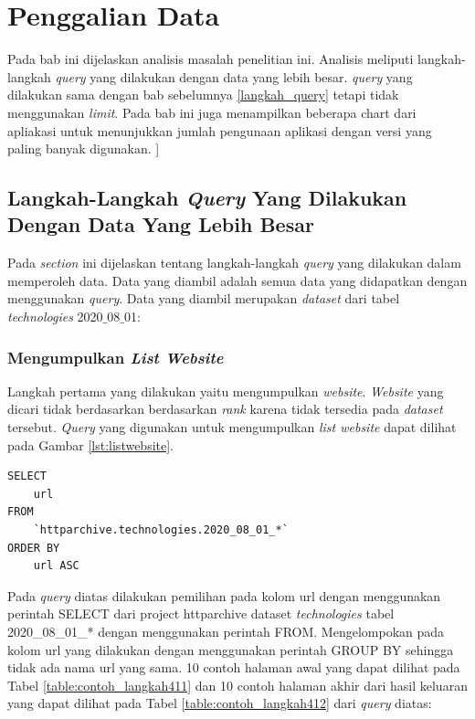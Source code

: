 \chapter{Penggalian Data}
\label{chap:penggalian data}
Pada bab ini dijelaskan analisis masalah penelitian ini. Analisis meliputi langkah-langkah \textit{query} yang dilakukan dengan data yang lebih besar. \textit{query} yang dilakukan sama dengan bab sebelumnya \ref{langkah_query} tetapi tidak menggunakan \textit{limit}. Pada bab ini juga menampilkan beberapa chart dari apliakasi untuk menunjukkan jumlah pengunaan aplikasi dengan versi yang paling banyak digunakan. ]

\section{Langkah-Langkah \textit{Query} Yang Dilakukan Dengan Data Yang Lebih Besar}
Pada \textit{section} ini dijelaskan tentang langkah-langkah \textit{query} yang dilakukan dalam memperoleh data. Data yang diambil adalah semua data yang didapatkan dengan menggunakan \textit{query}. Data yang diambil merupakan \textit{dataset} dari tabel \textit{technologies} 2020$\_$08$\_$01:

\subsection{Mengumpulkan \textit{List Website}}
Langkah pertama yang dilakukan yaitu mengumpulkan \textit{website}. \textit{Website} yang dicari tidak berdasarkan berdasarkan \textit{rank} karena tidak tersedia pada \textit{dataset} tersebut. \textit{Query} yang digunakan untuk mengumpulkan \textit{list website} dapat dilihat pada Gambar \ref{lst:listwebsite}.
\begin{lstlisting}[caption={Mendapatkan Daftar \textit{Website}}, label={lst:listwebsite}]
SELECT 
	url
FROM 
	`httparchive.technologies.2020_08_01_*`
ORDER BY 
	url ASC
\end{lstlisting}

Pada \textit{query} diatas dilakukan pemilihan pada kolom url dengan menggunakan perintah SELECT dari project httparchive dataset \textit{technologies} tabel 2020\_08\_01\_* dengan menggunakan perintah FROM. Mengelompokan pada kolom url yang dilakukan dengan menggunakan perintah GROUP BY sehingga tidak ada nama url yang sama.  10 contoh halaman awal yang dapat dilihat pada Tabel \ref{table:contoh_langkah411} dan 10 contoh halaman akhir dari hasil keluaran yang dapat dilihat pada Tabel \ref{table:contoh_langkah412} dari \textit{query} diatas:

